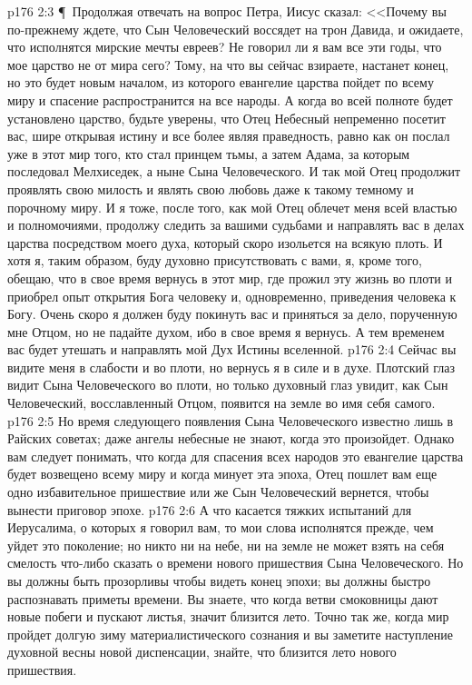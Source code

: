 \vs p176 2:3 \P\ Продолжая отвечать на вопрос Петра, Иисус сказал: <<Почему вы по\hyp{}прежнему ждете, что Сын Человеческий воссядет на трон Давида, и ожидаете, что исполнятся мирские мечты евреев? Не говорил ли я вам все эти годы, что мое царство не от мира сего? Тому, на что вы сейчас взираете, настанет конец, но это будет новым началом, из которого евангелие царства пойдет по всему миру и спасение распространится на все народы. А когда во всей полноте будет установлено царство, будьте уверены, что Отец Небесный непременно посетит вас, шире открывая истину и все более являя праведность, равно как он послал уже в этот мир того, кто стал принцем тьмы, а затем Адама, за которым последовал Мелхиседек, а ныне Сына Человеческого. И так мой Отец продолжит проявлять свою милость и являть свою любовь даже к такому темному и порочному миру. И я тоже, после того, как мой Отец облечет меня всей властью и полномочиями, продолжу следить за вашими судьбами и направлять вас в делах царства посредством моего духа, который скоро изольется на всякую плоть. И хотя я, таким образом, буду духовно присутствовать с вами, я, кроме того, обещаю, что в свое время вернусь в этот мир, где прожил эту жизнь во плоти и приобрел опыт открытия Бога человеку и, одновременно, приведения человека к Богу. Очень скоро я должен буду покинуть вас и приняться за дело, порученную мне Отцом, но не падайте духом, ибо в свое время я вернусь. А тем временем вас будет утешать и направлять мой Дух Истины вселенной.
\vs p176 2:4 Сейчас вы видите меня в слабости и во плоти, но вернусь я в силе и в духе. Плотский глаз видит Сына Человеческого во плоти, но только духовный глаз увидит, как Сын Человеческий, восславленный Отцом, появится на земле во имя себя самого.
\vs p176 2:5 Но время следующего появления Сына Человеческого известно лишь в Райских советах; даже ангелы небесные не знают, когда это произойдет. Однако вам следует понимать, что когда для спасения всех народов это евангелие царства будет возвещено всему миру и когда минует эта эпоха, Отец пошлет вам еще одно избавительное пришествие или же Сын Человеческий вернется, чтобы вынести приговор эпохе.
\vs p176 2:6 А что касается тяжких испытаний для Иерусалима, о которых я говорил вам, то мои слова исполнятся прежде, чем уйдет это поколение; но никто ни на небе, ни на земле не может взять на себя смелость что\hyp{}либо сказать о времени нового пришествия Сына Человеческого. Но вы должны быть прозорливы чтобы видеть конец эпохи; вы должны быстро распознавать приметы времени. Вы знаете, что когда ветви смоковницы дают новые побеги и пускают листья, значит близится лето. Точно так же, когда мир пройдет долгую зиму материалистического сознания и вы заметите наступление духовной весны новой диспенсации, знайте, что близится лето нового пришествия.
